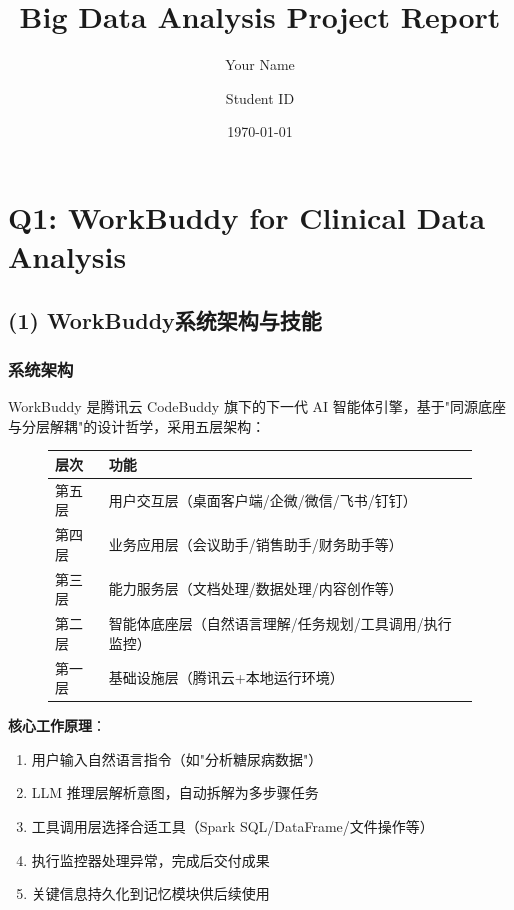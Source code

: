 \documentclass[12pt,a4paper]{article}
\begin{document}
\title{\textbf{Big Data Analysis Project Report}}
\author{Your Name \and Student ID}
\date{\today}

\maketitle
\newpage

\section{Q1: WorkBuddy for Clinical Data Analysis}

\subsection{(1) WorkBuddy系统架构与技能}

\subsubsection{系统架构}

WorkBuddy 是腾讯云 CodeBuddy 旗下的下一代 AI 智能体引擎，基于"同源底座与分层解耦"的设计哲学，采用五层架构：

\begin{figure}[H]
\centering
\begin{minipage}{0.45\textwidth}
\centering
\begin{tabular}{|p{2.5cm}|p{3.5cm}|}
\hline
\textbf{层次} & \textbf{功能} \\ \hline
第五层 & 用户交互层（桌面客户端/企微/微信/飞书/钉钉）\\ \hline
第四层 & 业务应用层（会议助手/销售助手/财务助手等）\\ \hline
第三层 & 能力服务层（文档处理/数据处理/内容创作等）\\ \hline
第二层 & 智能体底座层（自然语言理解/任务规划/工具调用/执行监控）\\ \hline
第一层 & 基础设施层（腾讯云+本地运行环境）\\ \hline
\end{tabular}
\end{minipage}
\end{figure}

\textbf{核心工作原理}：

\begin{enumerate}
    \item 用户输入自然语言指令（如"分析糖尿病数据"）
    \item LLM 推理层解析意图，自动拆解为多步骤任务
    \item 工具调用层选择合适工具（Spark SQL/DataFrame/文件操作等）
    \item 执行监控器处理异常，完成后交付成果
    \item 关键信息持久化到记忆模块供后续使用
\end{enumerate}
\end{document}
